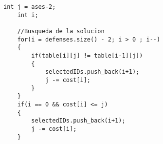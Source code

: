 \begin{lstlisting}
int j = ases-2;
    int i;
    
    //Busqueda de la solucion
    for(i = defenses.size() - 2; i > 0 ; i--)
    {
        if(table[i][j] != table[i-1][j])
        {
            selectedIDs.push_back(i+1);
            j -= cost[i];
        }
    }
    if(i == 0 && cost[i] <= j)
    {
        selectedIDs.push_back(i+1);
        j -= cost[i];
    }  
\end{lstlisting}